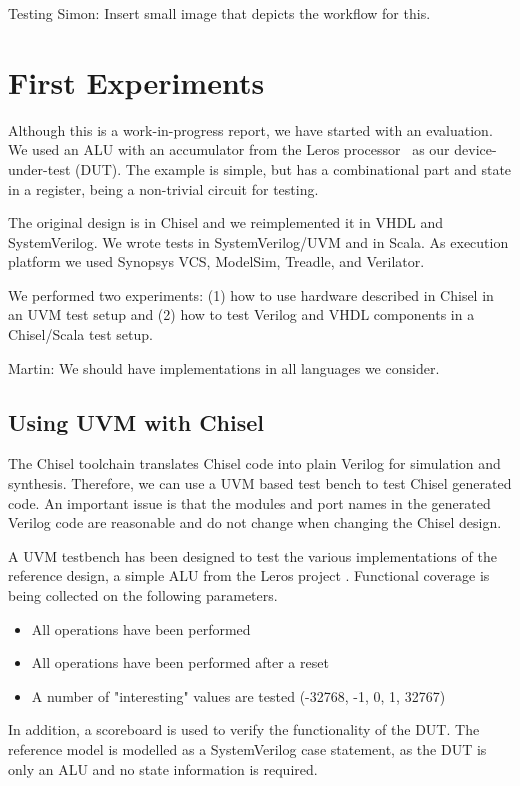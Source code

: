 \documentclass[conference]{IEEEtran}
\newcommand{\martin}[1]{{\color{blue} Martin: #1}}
\newcommand{\simon}[1]{{\color{green} Simon: #1}}
\begin{document}
Testing
\simon{Insert small image that depicts the workflow for this.}

\section{First Experiments}

Although this is a work-in-progress report, we have started with an evaluation.
We used an ALU with an accumulator from the Leros processor~\cite{leros:arcs2019}
as our device-under-test (DUT).
The example is simple, but has a combinational part and state in a register, being
a non-trivial circuit for testing.

The original design is in Chisel and we reimplemented it in VHDL and SystemVerilog.
We wrote tests in SystemVerilog/UVM and in Scala.
As execution platform we used Synopsys VCS, ModelSim, Treadle, and Verilator.

We performed two experiments: (1) how to use hardware described in Chisel in an
UVM test setup and (2) how to test Verilog and VHDL components in a Chisel/Scala
test setup.

\martin{We should have implementations in all languages we consider.}


\subsection{Using UVM with Chisel}

The Chisel toolchain translates Chisel code into plain Verilog for simulation and synthesis. Therefore, we can use a UVM based test bench to test Chisel generated code.
An important issue is that the modules and port names in the generated Verilog code are reasonable and do not change when changing the Chisel design.

A UVM testbench has been designed to test the various implementations of the reference design, a simple ALU from the Leros project \cite{leros:fpl2011}. Functional coverage is being collected on the following parameters.
\begin{itemize}
    \item All operations have been performed
    \item All operations have been performed after a reset
    \item A number of "interesting" values are tested (-32768, -1, 0, 1, 32767)
\end{itemize}

In addition, a scoreboard is used to verify the functionality of the DUT. The reference model is modelled as a SystemVerilog case statement, as the DUT is only an ALU and no state information is required.
\end{document}
